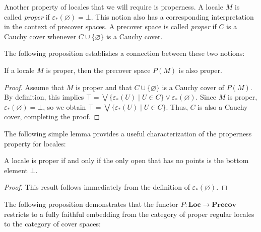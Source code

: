 \documentclass[reqno]{amsart}
\theoremstyle{definition}
\theoremstyle{remark}
\numberwithin{figure}{section}
\newcommand{\cat}[1]{\mathbf{#1}}
\begin{document}
Another property of locales that we will require is properness.
A locale $M$ is called \emph{proper} if $\varepsilon_*(\varnothing) = \bot$.
This notion also has a corresponding interpretation in the context of precover spaces.
A precover space is called \emph{proper} if $C$ is a Cauchy cover whenever $C \cup \{ \varnothing \}$ is a Cauchy cover.

The following proposition establishes a connection between these two notions:

\begin{prop}
If a locale $M$ is proper, then the precover space $P(M)$ is also proper.
\end{prop}
\begin{proof}
Assume that $M$ is proper and that $C \cup \{ \varnothing \}$ is a Cauchy cover of $P(M)$.
By definition, this implies $\top = \bigvee \{ \varepsilon_*(U) \mid U \in C \} \vee \varepsilon_*(\varnothing)$.
Since $M$ is proper, $\varepsilon_*(\varnothing) = \bot$, so we obtain $\top = \bigvee \{ \varepsilon_*(U) \mid U \in C \}$.
Thus, $C$ is also a Cauchy cover, completing the proof.
\end{proof}

The following simple lemma provides a useful characterization of the properness property for locales:

\begin{lem}
A locale is proper if and only if the only open that has no points is the bottom element $\bot$.
\end{lem}
\begin{proof}
This result follows immediately from the definition of $\varepsilon_*(\varnothing)$.
\end{proof}

The following proposition demonstrates that the functor $P : \cat{Loc} \to \cat{Precov}$ restricts to a fully faithful embedding from the category of proper regular locales to the category of cover spaces:
\end{document}
